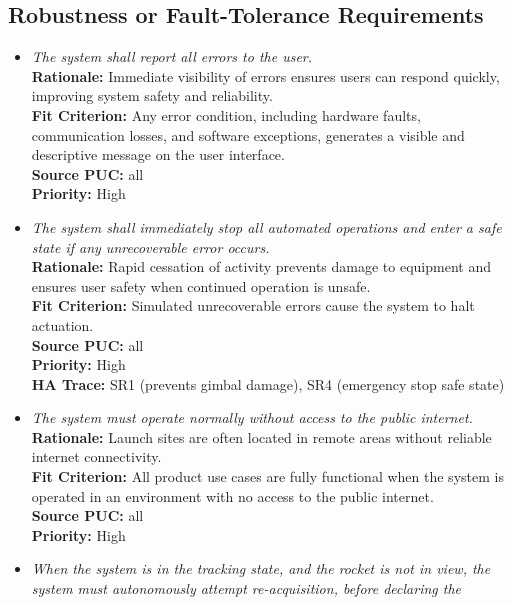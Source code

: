 \documentclass[12pt]{article}
\begin{document}
\subsection{Robustness or Fault-Tolerance Requirements}
\begin{itemize}[leftmargin=*]
  \item[RFR-1] \emph{The system shall report all errors to the user.}\\[2mm]
        \textbf{Rationale:} Immediate visibility of errors ensures users can respond quickly, improving system safety and reliability.\\
        \textbf{Fit Criterion:} Any error condition, including hardware faults, communication losses, and software exceptions, generates a visible and descriptive message on the user interface.\\
        \textbf{Source PUC:} all \\
        \textbf{Priority:} High
  \item[RFR-2] \emph{The system shall immediately stop all automated operations and
          enter a safe state if any unrecoverable error occurs.}\\[2mm]
        \textbf{Rationale:} Rapid cessation of activity prevents damage to equipment and ensures user safety when continued operation is unsafe.\\
        \textbf{Fit Criterion:} Simulated unrecoverable errors cause the system to halt actuation.\\
        \textbf{Source PUC:} all \\
        \textbf{Priority:} High \\
        \textbf{HA Trace:} SR1 (prevents gimbal damage), SR4 (emergency stop safe state)
  \item[RFR-3] \emph{The system must operate normally without access to the public
          internet.}\\[2mm]
        \textbf{Rationale:} Launch sites are often located in remote areas without reliable internet connectivity.\\
        \textbf{Fit Criterion:} All product use cases are fully functional when the system is operated in an environment with no access to the public internet.\\
        \textbf{Source PUC:} all \\
        \textbf{Priority:} High
  \item[RFR-4] \emph{When the system is in the tracking state, and the rocket is not in
          view, the system must autonomously attempt re-acquisition, before declaring the
}
\end{itemize}
\end{document}
